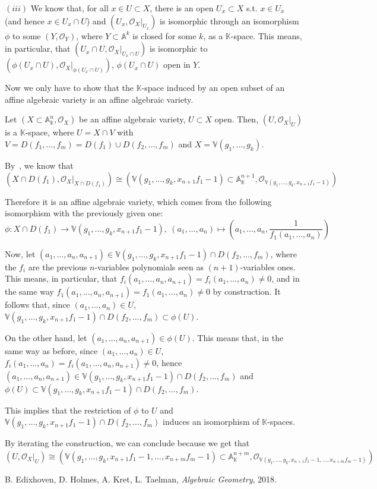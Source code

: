 \documentclass{article}
\newcommand{\numberset}{\mathbb}
\newcommand{\K}{\numberset{K}}
\newcommand{\V}{\mathbb{V}}
\newcommand{\A}{\mathbb{A}}
\begin{document}
$(iii)$ We know that, for all $x\in U\subset X$, there is an open $U_x\subset X$ s.t. $x\in U_x$ (and hence $x\in U_x\cap U$) and $(U_x,\mathcal{O}_X|_{U_x})$ is isomorphic through an isomorphism $\phi$ to some $(Y,\mathcal{O}_Y)$, where $Y\subset\A^k$ is closed for some $k$, as a $\K$-space. This means, in particular, that $(U_x\cap U,\mathcal{O}_X|_{U_x\cap U})$ is isomorphic to $(\phi(U_x\cap U),\mathcal{O}_X|_{\phi(U_x\cap U)})$, $\phi(U_x\cap U)$ open in $Y$.

Now we only have to show that the $\K$-space induced by an open subset of an affine algebraic variety is an affine algebraic variety.

Let $(X\subset\A^n_{\K},\mathcal{O}_X)$ be an affine algebraic variety, $U\subset X$ open. Then, $(U,\mathcal{O}_X|_U)$ is a $\K$-space, where $U=X\cap V$ with $V=D(f_1,\ldots,f_m)=D(f_1)\cup D(f_2,\ldots,f_m)$ and $X=\V(g_1,\ldots,g_k)$.

By~\cite[cor. 5.1.7]{edix}, we know that$$(X\cap D(f_1),\mathcal{O}_X|_{X\cap D(f_1)})\cong(\V(g_1,\ldots,g_k,x_{n+1}f_1-1)\subset\A^{n+1}_{\K},\mathcal{O}_{\V(g_1,\ldots,g_k,x_{n+1}f_1-1)})$$

Therefore it is an affine algebraic variety, which comes from the following isomorphism with the previously given one:
$$\phi:X\cap D(f_1)\rightarrow \V(g_1,\ldots,g_k,x_{n+1}f_1-1),\ (a_1,\ldots,a_n)\mapsto (a_1,\ldots,a_n,\frac{1}{f_1(a_1,\ldots,a_n)})$$

Now, let $(a_1,\ldots,a_n,a_{n+1})\in\V(g_1,\ldots,g_k,x_{n+1}f_1-1)\cap D(f_2,\ldots,f_m)$, where the $f_i$ are the previous $n$-variables polynomials seen as $(n+1)$-variables ones. This means, in particular, that $f_i(a_1,\ldots,a_n,a_{n+1})=f_i(a_1,\ldots,a_n)\neq 0$, and in the same way $f_1(a_1,\ldots,a_n,a_{n+1})=f_1(a_1,\ldots,a_n)\neq 0$ by construction. It follows that, since $(a_1,\ldots,a_n)\in U$, $\V(g_1,\ldots,g_k,x_{n+1}f_1-1)\cap D(f_2,\ldots,f_m)\subset\phi(U)$.

On the other hand, let $(a_1,\ldots,a_n,a_{n+1})\in\phi(U)$. This means that, in the same way as before, since $(a_1,\ldots,a_n)\in U$, $f_i(a_1,\ldots,a_n)=f_i(a_1,\ldots,a_n,a_{n+1})\neq 0$, hence $(a_1,\ldots,a_n,a_{n+1})\in\V(g_1,\ldots,g_k,x_{n+1}f_1-1)\cap D(f_2,\ldots,f_m)$ and $\phi(U)\subset\V(g_1,\ldots,g_k,x_{n+1}f_1-1)\cap D(f_2,\ldots,f_m)$.

This implies that the restriction of $\phi$ to $U$ and $\V(g_1,\ldots,g_k,x_{n+1}f_1-1)\cap D(f_2,\ldots,f_m)$ induces an isomorphism of $\K$-spaces.

By iterating the construction, we can conclude because we get that$$(U,\mathcal{O}_X|_U)\cong(\V(g_1,\ldots,g_k,x_{n+1}f_1-1,\ldots,x_{n+m}f_m-1)\subset\A^{n+m}_{\K},\mathcal{O}_{\V(g_1,\ldots,g_k,x_{n+1}f_1-1,\ldots,x_{n+m}f_m-1)})$$



\begin{thebibliography}{9}
	B. Edixhoven, D. Holmes, A. Kret, L. Taelman,
	\textit{Algebraic Geometry},
	2018.
\end{thebibliography}
\end{document}
